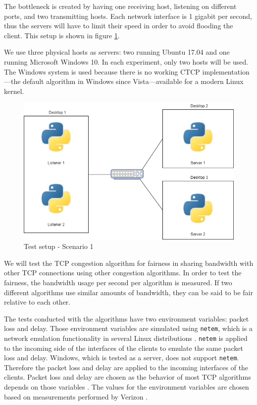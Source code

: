 \documentclass{article}
\begin{document}
The bottleneck is created by having one receiving host, listening on different
ports, and two transmitting hosts. Each network interface is 1 gigabit per
second, thus the servers will have to limit their speed in order to avoid
flooding the client. This setup is shown in figure \ref{fig:setup1}.

We use three physical hosts as servers: two running Ubuntu 17.04 and one
running Microsoft Windows 10. In each experiment, only two hosts will be used.
The Windows system is used because there is no working CTCP
implementation---the default algorithm in Windows since Vista---available for a
modern Linux kernel.

\begin{figure}[H]
	\centering
		\includegraphics[scale=0.5]{figs/setup2.png}
		\caption{Test setup - Scenario 1}
	\label{fig:setup1}
\end{figure}

We will test the TCP congestion algorithm for fairness in sharing bandwidth
with other TCP connections using other congestion algorithms. In order to test
the fairness, the bandwidth usage per second per algorithm is measured. If two
different algorithms use similar amounts of bandwidth, they can be said to be
fair relative to each other.

The tests conducted with the algorithms have two environment variables: packet loss and delay. Those environment variables are simulated using \texttt{netem}, which is a network emulation functionality in several Linux distributions \cite{linux-netem}. \texttt{netem} is applied to the incoming side of the interfaces of the clients to emulate the same packet loss and delay. Windows, which is tested as a server, does not support \texttt{netem}. Therefore the packet loss and delay are applied to the incoming interfaces of the clients. Packet loss and delay are chosen as the behavior of most TCP algorithms depends on those variables \cite{bbr-congestion}\cite{bic-tcp-congestion}\cite{compound-tcp-congestion}\cite{cubic-tcp-congestion}\cite{dctcp-congestion}. The values for the environment variables are chosen based on measurements performed by Verizon \cite{verizon-latency}.
\end{document}
